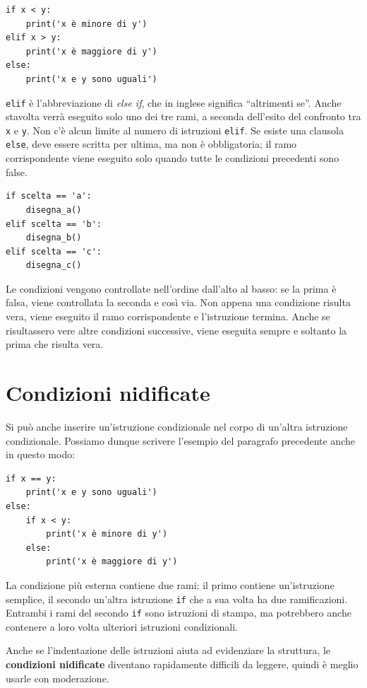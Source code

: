 \documentclass[10pt]{book}
\begin{document}
\begin{verbatim}
if x < y:
    print('x è minore di y')
elif x > y:
    print('x è maggiore di y')
else:
    print('x e y sono uguali')
\end{verbatim}
%
{\tt elif} è l'abbreviazione di {\em else if}, che in inglese significa ``altrimenti se''. Anche stavolta verrà eseguito solo uno dei tre rami, a seconda dell'esito del confronto tra {\tt x} e {\tt y}. Non c'è alcun limite al numero di istruzioni {\tt elif}. Se esiste una clausola {\tt else}, deve essere scritta per ultima, ma non è obbligatoria; il ramo corrispondente viene eseguito solo quando tutte le condizioni precedenti sono false.


\begin{verbatim}
if scelta == 'a':
    disegna_a()
elif scelta == 'b':
    disegna_b()
elif scelta == 'c':
    disegna_c()
\end{verbatim}
%
Le condizioni vengono controllate nell'ordine dall'alto al basso: se la prima è falsa, viene controllata la seconda e così via. Non appena una condizione risulta vera, viene eseguito il ramo corrispondente e l'istruzione termina. Anche se risultassero vere altre condizioni successive, viene eseguita sempre e soltanto la prima che risulta vera.  


\section{Condizioni nidificate}

Si può anche inserire un'istruzione condizionale nel corpo di un'altra istruzione condizionale. Possiamo dunque scrivere l'esempio del paragrafo precedente anche in questo modo:

\begin{verbatim}
if x == y:
    print('x e y sono uguali')
else:
    if x < y:
        print('x è minore di y')
    else:
        print('x è maggiore di y')
\end{verbatim}
%
La condizione più esterna contiene due rami: il primo contiene un'istruzione semplice, il secondo un'altra istruzione {\tt if} che a sua volta ha due ramificazioni. Entrambi i rami del secondo {\tt if} sono istruzioni di stampa, ma potrebbero anche contenere a loro volta ulteriori istruzioni condizionali.

Anche se l'indentazione delle istruzioni aiuta ad evidenziare la struttura, le {\bf condizioni nidificate} diventano rapidamente difficili da leggere, quindi è meglio usarle con moderazione.
\end{document}
